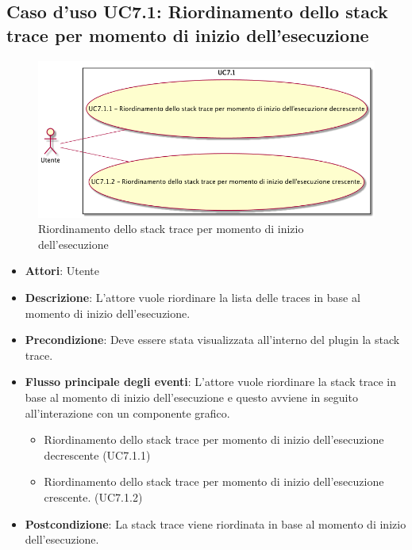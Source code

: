 \subsection{Caso d'uso UC7.1: Riordinamento dello stack trace per momento di inizio dell'esecuzione}
\begin{figure} [H]
\centering
\includegraphics[scale=0.45]{./UC/UC7-1.png}
\caption{Riordinamento dello stack trace per momento di inizio dell'esecuzione}\label{}
\end{figure}
\begin{itemize}
\item \textbf{Attori}: Utente
\item \textbf{Descrizione}: L'attore vuole riordinare la lista delle traces in base al momento di inizio dell'esecuzione.
\item \textbf{Precondizione}: Deve essere stata visualizzata all'interno del plugin la stack trace.
\item \textbf{Flusso principale degli eventi}: L'attore vuole riordinare la stack trace in base al momento di inizio dell'esecuzione e questo avviene in seguito all'interazione con un componente grafico.
\begin{itemize}
\item Riordinamento dello stack trace per momento di inizio dell'esecuzione decrescente (UC7.1.1)
\item Riordinamento dello stack trace per momento di inizio dell'esecuzione crescente. (UC7.1.2)
\end{itemize}
\item \textbf{Postcondizione}: La stack trace viene riordinata in base al momento di inizio dell'esecuzione.
\end{itemize}
